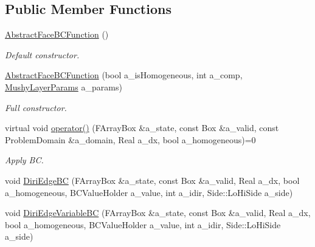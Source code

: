 \subsection*{Public Member Functions}
\begin{DoxyCompactItemize}
\item 
\hypertarget{class_abstract_face_b_c_function_afab41831f92499fc4d586c15c04a65e7}{\hyperlink{class_abstract_face_b_c_function_afab41831f92499fc4d586c15c04a65e7}{Abstract\-Face\-B\-C\-Function} ()}\label{class_abstract_face_b_c_function_afab41831f92499fc4d586c15c04a65e7}

\begin{DoxyCompactList}\small\item\em Default constructor. \end{DoxyCompactList}\item 
\hypertarget{class_abstract_face_b_c_function_a3a4587e8021aa687ad3903f99e415e1f}{\hyperlink{class_abstract_face_b_c_function_a3a4587e8021aa687ad3903f99e415e1f}{Abstract\-Face\-B\-C\-Function} (bool a\-\_\-is\-Homogeneous, int a\-\_\-comp, \hyperlink{class_mushy_layer_params}{Mushy\-Layer\-Params} a\-\_\-params)}\label{class_abstract_face_b_c_function_a3a4587e8021aa687ad3903f99e415e1f}

\begin{DoxyCompactList}\small\item\em Full constructor. \end{DoxyCompactList}\item 
\hypertarget{class_abstract_face_b_c_function_a7a864bc2f35778cd44d812c5c86db04b}{virtual void \hyperlink{class_abstract_face_b_c_function_a7a864bc2f35778cd44d812c5c86db04b}{operator()} (F\-Array\-Box \&a\-\_\-state, const Box \&a\-\_\-valid, const Problem\-Domain \&a\-\_\-domain, Real a\-\_\-dx, bool a\-\_\-homogeneous)=0}\label{class_abstract_face_b_c_function_a7a864bc2f35778cd44d812c5c86db04b}

\begin{DoxyCompactList}\small\item\em Apply B\-C. \end{DoxyCompactList}\item 
void \hyperlink{class_abstract_face_b_c_function_a176156d1142b51236652bbde0dee520a}{Diri\-Edge\-B\-C} (F\-Array\-Box \&a\-\_\-state, const Box \&a\-\_\-valid, Real a\-\_\-dx, bool a\-\_\-homogeneous, B\-C\-Value\-Holder a\-\_\-value, int a\-\_\-idir, Side\-::\-Lo\-Hi\-Side a\-\_\-side)
\item 
\hypertarget{class_abstract_face_b_c_function_a8a2f9d7139561aebae6dfd424d824fdb}{void \hyperlink{class_abstract_face_b_c_function_a8a2f9d7139561aebae6dfd424d824fdb}{Diri\-Edge\-Variable\-B\-C} (F\-Array\-Box \&a\-\_\-state, const Box \&a\-\_\-valid, Real a\-\_\-dx, bool a\-\_\-homogeneous, B\-C\-Value\-Holder a\-\_\-value, int a\-\_\-idir, Side\-::\-Lo\-Hi\-Side a\-\_\-side)}\label{class_abstract_face_b_c_function_a8a2f9d7139561aebae6dfd424d824fdb}


\end{DoxyCompactItemize}
